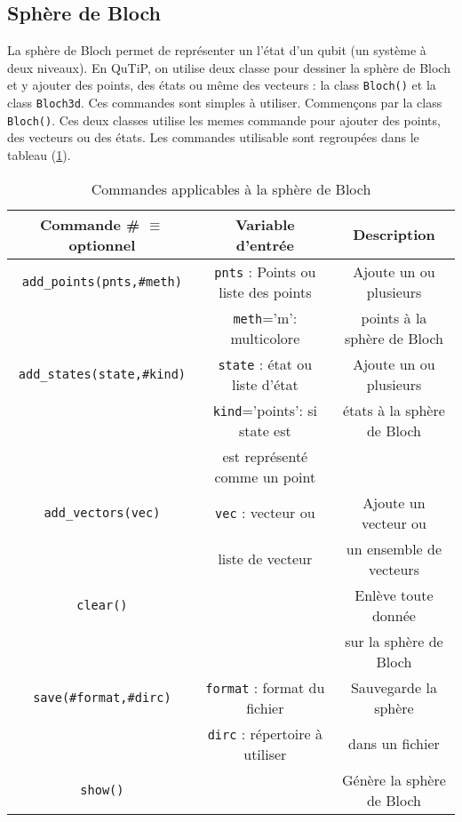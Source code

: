 \begin{itemize}
\section{Sphère de Bloch}
La sphère de Bloch permet de représenter un l'état d'un qubit (un système à 
deux niveaux). En QuTiP, on utilise deux classe pour dessiner la sphère de Bloch 
et y ajouter des points, des états ou même des vecteurs : la class 
\texttt{Bloch()} et la class \texttt{Bloch3d}. Ces commandes sont simples à 
utiliser. Commençons par la class \texttt{Bloch()}. Ces deux classes utilise les 
memes commande pour ajouter des points, des vecteurs ou des états. Les commandes 
utilisable sont regroupées dans le tableau (\ref{Bloch}).
\begin{table}[!h]
\begin{center}
\begin{tabular}{|c|c|c|}\hline \hline
\textbf{Commande # $\equiv$ optionnel} & \textbf{Variable d'entrée} & 
\textbf{Description} \\ \hline \hline
\texttt{add\_points(pnts,#meth)} & \texttt{pnts} : Points ou liste des points & 
Ajoute un ou plusieurs\\
 & \texttt{meth}='m': multicolore & points à la sphère de Bloch \\ \hline
\texttt{add\_states(state,#kind)} & \texttt{state} : état ou liste d'état & 
Ajoute un ou plusieurs \\
 & \texttt{kind}='points': si state est & états à la sphère de Bloch \\
 & est représenté comme un point & \\ \hline
\texttt{add\_vectors(vec)} & \texttt{vec} : vecteur ou & Ajoute un vecteur ou \\
 & liste de vecteur & un ensemble de vecteurs \\ \hline
\texttt{clear()} & & Enlève toute donnée \\
 & & sur la sphère de Bloch \\ \hline
\texttt{save(#format,#dirc)} & \texttt{format} : format du fichier & 
Sauvegarde la sphère \\
 & \texttt{dirc} : répertoire à utiliser & dans un fichier \\ \hline
\texttt{show()} & & Génère la sphère de Bloch\\ \hline
\end{tabular}
\end{center}
\caption{Commandes applicables à la sphère de Bloch}
\label{Bloch}
\end{table}


\end{itemize}
